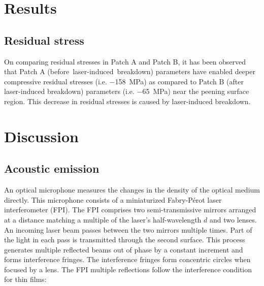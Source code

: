 \documentclass[sn-nature]{sn-jnl}%
\theoremstyle{thmstyleone}%
\theoremstyle{thmstyletwo}%
\theoremstyle{thmstylethree}%
\begin{document}

\section{Results}\label{sec:results}



    \subsection{Residual stress}
    On comparing residual stresses in Patch A and Patch B, it has been observed that Patch A \mbox{(before laser-induced breakdown)} parameters have enabled deeper compressive residual stresses (i.e. \SI[]{-158}{\mega\pascal}) as compared to Patch B (after laser-induced breakdown) parameters (i.e. \SI[]{-65}{\mega\pascal}) near the peening surface region. This decrease in residual stresses is caused by laser-induced breakdown. 



\section{Discussion}\label{sec:results}

    \subsection{Acoustic emission}

    An optical microphone measures the changes in the density of the optical medium directly. This microphone consists of a miniaturized Fabry-Pérot laser interferometer (FPI). The FPI comprises two semi-transmissive mirrors arranged at a distance matching a multiple of the laser’s half-wavelength $d$ and two lenses.
    An incoming laser beam passes between the two mirrors multiple times. Part of the light in each pass is transmitted through the second surface. This process generates multiple reflected beams out of phase by a constant increment and forms interference fringes. The interference fringes form concentric circles when focused by a lens. The FPI multiple reflections follow the interference condition for thin films:
\end{document}

